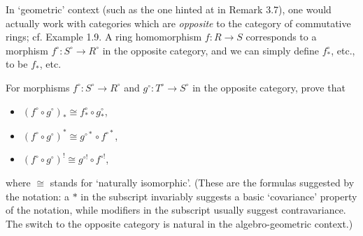\documentclass[../../master.tex]{subfiles}
\begin{document}
\begin{problem}
    In `geometric' context (such as the one hinted at in Remark 3.7), one would actually work with categories which are \textit{opposite} to the category of commutative rings; cf. Example 1.9.
    A ring homomorphism $f: R \to S$ corresponds to a morphism $f^{\circ}: S^{\circ} \to R^{\circ}$ in the opposite category, and we can simply define $f^{\circ}_{*}$, etc., to be $f_*$, etc.

    For morphisms $f^{\circ}: S^{\circ} \to R^{\circ}$ and $g^{\circ}: T^{\circ} \to S^{\circ}$ in the opposite category, prove that
    \begin{itemize}
        \item $(f^{\circ} \circ g^{\circ})_{*} \cong f^{\circ}_* \circ g^{\circ}_*$,
        \item $(f^{\circ} \circ g^{\circ})^{*} \cong g^{\circ *} \circ f^{\circ *}$,
        \item $(f^{\circ} \circ g^{\circ})^{!} \cong g^{\circ !} \circ f^{\circ !}$,
    \end{itemize}
    where $\cong$ stands for `naturally isomorphic'.
    (These are the formulas suggested by the notation:
    a $*$ in the subscript invariably suggests a basic `covariance' property of the notation, while modifiers in the subscript usually suggest contravariance.
    The switch to the opposite category is natural in the algebro-geometric context.)
\end{problem}
\end{document}
